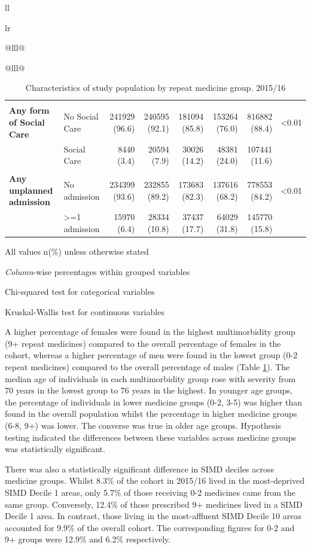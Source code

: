 \documentclass[12pt,a4paper,oneside,table]{report}
\begin{document}
\begin{tabular}[t]{ll}
\begin{tabular}{lr}
{\begin{tabular}{@{}lll@{}}
\begin{tabular}{@{}lll@{}}
\begin{table}[]
{\begin{threeparttable}
\begin{tabular}{@{}llrrrrrr@{}}
{} & & & & & & & \\
\textbf{Any form of Social Care} & No Social Care & 241929 (96.6) & 240595 (92.1) & 181094 (85.8) & 153264 (76.0) & 816882 (88.4) & \textless 0.01 \\
\textbf{} & Social Care & 8440 (3.4) & 20594 (7.9) & 30026 (14.2) & 48381 (24.0) & 107441 (11.6) & \\
{} & & & & & & & \\
\textbf{Any unplanned admission} & No admission & 234399 (93.6) & 232855 (89.2) & 173683 (82.3) & 137616 (68.2) & 778553 (84.2) & \textless 0.01 \\
\textbf{} & \textgreater{}=1 admission & 15970 (6.4) & 28334 (10.8) & 37437 (17.7) & 64029 (31.8) & 145770 (15.8) & \\ \bottomrule
\end{tabular}%
\begin{tablenotes}
\item \footnotesize{All values n(\%) unless otherwise stated} 
\item \footnotesize{\emph{Column}-wise percentages within grouped variables}
\item \footnotesize{Chi-squared test for categorical variables}
\item \footnotesize{Kruskal-Wallis test for continuous variables}
\end{tablenotes}
\end{threeparttable}%
}
\caption{Characteristics of study population by repeat medicine group. 2015/16}
\label{tab:res1-mmgroups}
\end{table}

A higher percentage of females were found in the highest multimorbidity
group (9+ repeat medicines) compared to the overall percentage of
females in the cohort, whereas a higher percentage of men were found in
the lowest group (0-2 repeat medicines) compared to the overall
percentage of males (Table \ref{tab:res1-mmgroups}). The median age of
individuals in each multimorbidity group rose with severity from 70
years in the lowest group to 76 years in the highest. In younger age
groups, the percentage of individuals in lower medicine groups (0-2,
3-5) was higher than found in the overall population whilst the
percentage in higher medicine groups (6-8, 9+) was lower. The converse
was true in older age groups. Hypothesis testing indicated the
differences between these variables across medicine groups was
statistically significant.

There was also a statistically significant difference in SIMD deciles
across medicine groups. Whilst 8.3\% of the cohort in 2015/16 lived in
the most-deprived SIMD Decile 1 areas, only 5.7\% of those receiving 0-2
medicines came from the same group. Conversely, 12.4\% of those
prescribed 9+ medicines lived in a SIMD Decile 1 area. In contrast,
those living in the most-affluent SIMD Decile 10 areas accounted for
9.9\% of the overall cohort. The corresponding figures for 0-2 and 9+
groups were 12.9\% and 6.2\% respectively.


\end{tabular}
\end{tabular}}
\end{tabular}
\end{tabular}
\end{document}
